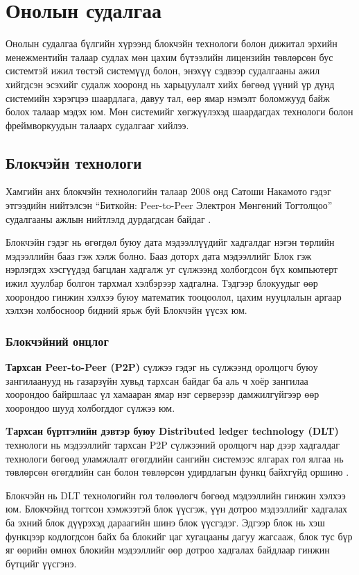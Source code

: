 \chapter{Онолын судалгаа}
Онолын судалгаа бүлгийн хүрээнд блокчэйн технологи болон дижитал эрхийн менежментийн талаар судлах мөн цахим бүтээлийн лицензийн төвлөрсөн бус системтэй ижил төстэй системүүд болон, энэхүү сэдвээр судалгааны ажил хийгдсэн эсэхийг судалж хооронд нь харьцуулалт хийх бөгөөд үүний үр дүнд системийн хэрэгцээ шаардлага, давуу тал, өөр ямар нэмэлт боломжууд байж болох талаар мэдэх юм. Мөн системийг хөгжүүлэхэд шаардагдах технологи болон фреймворкуудын талаарх судалгааг хийлээ.

\section{Блокчэйн технологи}
Хамгийн анх блокчэйн технологийн талаар 2008 онд Сатоши Накамото
гэдэг этгээдийн нийтэлсэн “Биткойн: Peer-to-Peer Электрон Мөнгөний Тогтолцоо” судалгааны ажлын нийтлэлд дурдагдсан байдаг \cite{blockchain}.

Блокчэйн гэдэг нь өгөгдөл буюу дата мэдээллүүдийг хадгалдаг нэгэн төрлийн мэдээллийн бааз гэж хэлж болно. Бааз доторх дата мэдээллийг Блок гэж нэрлэгдэх хэсгүүдэд багцлан хадгалж уг сүлжээнд холбогдсон бүх компьютерт ижил хуулбар болгон тархмал хэлбэрээр хадгална. Тэдгээр блокуудыг өөр хоорондоо гинжин хэлхээ буюу математик тооцоолол, цахим нууцлалын аргаар хэлхэн холбосноор бидний ярьж буй Блокчэйн үүсэх юм.

\subsection{Блокчэйний онцлог}
\textbf{Тархсан Peer-to-Peer (P2P)} сүлжээ гэдэг нь сүлжээнд оролцогч буюу зангилаанууд нь газарзүйн хувьд тархсан байдаг ба аль ч хоёр зангилаа хоорондоо байршлаас үл хамааран ямар нэг серверээр дамжилгүйгээр өөр хоорондоо шууд холбогддог сүлжээ юм.

\textbf{Tархсан бүртгэлийн дэвтэр буюу Distributed ledger technology (DLT)} технологи нь мэдээллийг тархсан P2P сүлжээний оролцогч нар дээр хадгалдаг технологи бөгөөд уламжлалт өгөгдлийн сангийн системээс ялгарах гол ялгаа нь төвлөрсөн өгөгдлийн сан болон төвлөрсөн удирдлагын функц байхгүйд оршино \cite{dlt}.

Блокчэйн нь DLT технологийн гол төлөөлөгч бөгөөд мэдээллийн гинжин хэлхээ юм. Блокчэйнд тогтсон хэмжээтэй блок үүсгэж, үүн дотроо мэдээллийг хадгалах ба эхний блок дүүрэхэд дараагийн шинэ блок үүсгэдэг. Эдгээр блок нь хэш функцээр кодлогдсон байх ба блокийг цаг хугацааны дагуу жагсааж, блок тус бүр яг өөрийн өмнөх блокийн мэдээллийг өөр дотроо хадгалах байдлаар гинжин бүтцийг үүсгэнэ.

